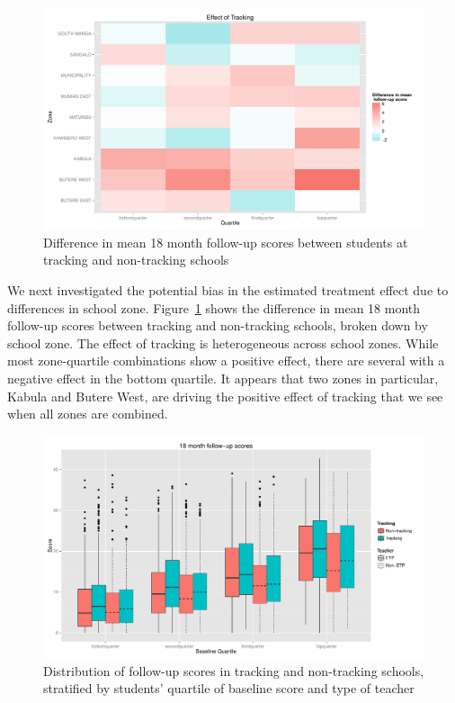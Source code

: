 \documentclass[11pt]{article}
\begin{document}
 \begin{figure}[H]
 \centering
 \includegraphics[scale=0.45]{tracking_by_zone.pdf}
 \caption{Difference in mean 18 month follow-up scores between students at tracking and non-tracking schools}
 \label{fig:stratif-zone}
 \end{figure}
 

We next investigated the potential bias in the estimated treatment effect due to differences in school zone.  Figure~\ref{fig:stratif-zone} shows the difference in mean 18 month follow-up scores between tracking and non-tracking schools, broken down by school zone.  The effect of tracking is heterogeneous across school zones.  While most zone-quartile combinations show a positive effect,  there are several with a negative effect in the bottom quartile.  It appears that two zones in particular, Kabula and Butere West, are driving the positive effect of tracking that we see when all zones are combined. \\

 
 \begin{figure}[h]
 \centering
 \includegraphics[scale=0.5]{tracking-etp-stratif.pdf}
 \caption{Distribution of follow-up scores in tracking and non-tracking schools, stratified by students' quartile of baseline score and type of teacher}
 \label{fig:tracking-etp}
 \end{figure}
 
\end{document}
